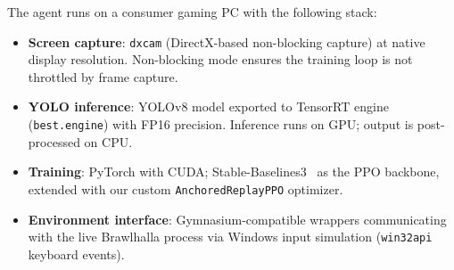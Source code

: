 \documentclass[11pt,a4paper]{article}
\begin{document}
The agent runs on a consumer gaming PC with the following stack:
\begin{itemize}[leftmargin=1.5em]
    \item \textbf{Screen capture}: \texttt{dxcam} (DirectX-based non-blocking capture) at native display resolution. Non-blocking mode ensures the training loop is not throttled by frame capture.
    \item \textbf{YOLO inference}: YOLOv8 model exported to TensorRT engine (\texttt{best.engine}) with FP16 precision. Inference runs on GPU; output is post-processed on CPU.
    \item \textbf{Training}: PyTorch with CUDA; Stable-Baselines3~\cite{raffin2021stable} as the PPO backbone, extended with our custom \texttt{AnchoredReplayPPO} optimizer.
    \item \textbf{Environment interface}: Gymnasium-compatible wrappers communicating with the live Brawlhalla process via Windows input simulation (\texttt{win32api} keyboard events).
\end{itemize}
\end{document}

